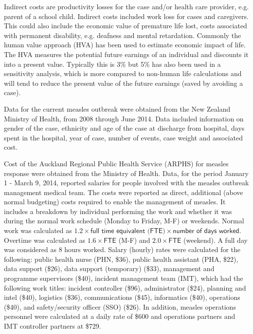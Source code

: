 \documentclass{article}
\begin{document}
{Indirect costs are productivity losses for the case and/or health care provider, e.g. parent of a school child. Indirect costs included work loss for cases and caregivers. This could also include the economic value of premature life lost, costs associated with permanent disability, e.g. deafness and mental retardation. Commonly the human value approach (HVA) has been used to estimate economic impact of life. The HVA measures the potential future earnings of an individual and discounts it into a present value. Typically this is 3\% but 5\% has also been used in a sensitivity analysis, which is more compared to non-human life calculations and will tend to reduce the present value of the future earnings (saved by avoiding a case).

Data for the current measles outbreak were obtained from the New Zealand Ministry of Health, from 2008 through June 2014. Data included information on gender of the case, ethnicity and age of the case at discharge from hospital, days spent in the hospital, year of case, number of events, case weight and associated cost.

Cost of the Auckland Regional Public Health Service (ARPHS) for measles response were obtained from the Ministry of Health. Data, for the period January 1 - March 9, 2014, reported salaries for people involved with the measles outbreak management medical team. The costs were reported as direct, additional (above normal budgeting) costs required to enable the management of measles. It includes a breakdown by individual performing the work and whether it was during the normal work schedule (Monday to Friday, M-F) or weekends. Normal work was calculated as $1.2 \times \textsf{full time equivalent (FTE)} \times \textsf{number of days worked}$. Overtime was calculated as $1.6\times\textsf{FTE}$ (M-F) and $2.0 \times \textsf{FTE}$ (weekend). A full day was considered as 8 hours worked. Salary (hourly) rates were calculated for the following: public health nurse (PHN, \$36), public health assistant (PHA, \$22), data support (\$26), data support (temporary) (\$33), management and programme supervisors (\$40), incident management team (IMT), which had the following work titles: incident controller (\$96), administrator (\$24), planning and intel (\$40), logistics (\$36), communications (\$45), informatics (\$40), operations (\$40), and safety/security officer (SSO) (\$26). In addition, measles operations personnel were calculated at a daily rate of \$600 and operations partners and IMT controller partners at \$729.

}
\end{document}
